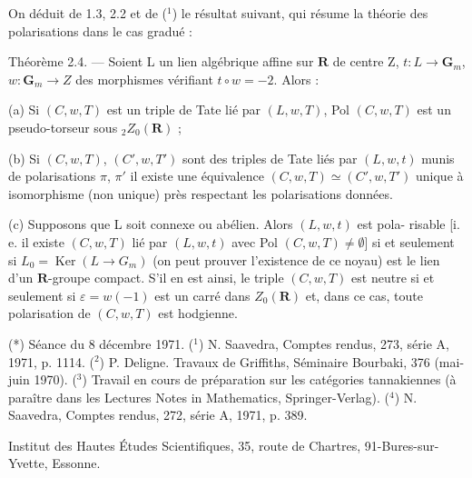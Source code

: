 \documentclass[11pt]{article}
\newcommand{\scanpage}[1]{\par\bigskip\noindent{\small\sffamily[scan #1]}\par}
\newcommand{\mspage}[1]{{\small\sffamily[p.\,#1]}}
\newcommand{\hand}[1]{\textcolor{blue}{#1}}
\begin{document}
On déduit de 1.3, 2.2 et de (${}^1$) le résultat suivant, qui résume la
théorie des polarisations dans le cas gradué :

Théorème 2.4. --- Soient L un lien algébrique affine sur $\mathbf{R}$ de centre Z,
$t : L \to \mathbf{G}_m$, $w : \mathbf{G}_m \to Z$ des morphismes vérifiant $t \circ w = -2$. Alors :

(a) Si $(C, w, T)$ est un triple de Tate lié par $(L, w, T)$, Pol $(C, w, T)$
est un pseudo-torseur sous ${}_2Z_0(\mathbf{R})$ ;

(b) Si $(C, w, T)$, $(C', w, T')$ sont des triples de Tate liés par $(L, w, t)$
munis de polarisations $\pi$, $\pi'$ il existe une équivalence $(C, w, T) \simeq (C', w, T')$
unique à isomorphisme (non unique) près respectant les polarisations données.

(c) Supposons que L soit connexe ou abélien. Alors $(L, w, t)$ est pola-%
risable [i. e. il existe $(C, w, T)$ lié par $(L, w, t)$ avec Pol $(C, w, T) \neq \emptyset$]
si et seulement si $L_0 = \operatorname{Ker}(L \to G_m)$ (on peut prouver l'existence de
ce noyau) est le lien d'un $\mathbf{R}$-groupe compact. S'il en est ainsi, le triple
$(C, w, T)$ est neutre si et seulement si $\varepsilon = w(-1)$ est un carré dans $Z_0(\mathbf{R})$
et, dans ce cas, toute polarisation de $(C, w, T)$ est hodgienne.

(*) Séance du 8 décembre 1971.
(${}^1$) N. Saavedra, Comptes rendus, 273, série A, 1971, p. 1114.
(${}^2$) P. Deligne. Travaux de Griffiths, Séminaire Bourbaki, 376 (mai-juin 1970).
(${}^3$) Travail en cours de préparation sur les catégories tannakiennes (à paraître dans
les Lectures Notes in Mathematics, Springer-Verlag).
(${}^4$) N. Saavedra, Comptes rendus, 272, série A, 1971, p. 389.

Institut
des Hautes Études Scientifiques,
35, route de Chartres,
91-Bures-sur-Yvette,
Essonne.

\mspage{\hand{67}}

\clearpage
\scanpage{119/68}
\end{document}
